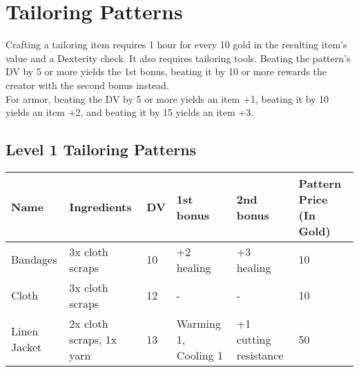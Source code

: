 \section{Tailoring Patterns}\label{sec:tailoringPatterns}
Crafting a tailoring item requires 1 hour for every 10 gold in the resulting item's value and a Dexterity check.
It also requires tailoring tools.
Beating the pattern's DV by 5 or more yields the 1st bonus, beating it by 10 or more rewards the creator with the second bonus instead.\\
For armor, beating the DV by 5 or more yields an item +1, beating it by 10 yields an item +2, and beating it by 15 yields an item +3.\\
	
\subsection{Level 1 Tailoring Patterns}
\begin{longtable}{p{1.5cm} | p{2.5cm} | l | p{2cm} | p{2cm} | p{1cm} }
	Name & Ingredients & DV  & 1st bonus & 2nd bonus & Pattern Price (In Gold)\\ \hline
	Bandages & 3x cloth scraps & 10 & +2 healing & +3 healing & 10\\
	Cloth & 3x cloth scraps & 12 & - & - & 10\\
	Linen Jacket & 2x cloth scraps, 1x yarn & 13 & Warming 1, Cooling 1 & +1 cutting resistance & 50\\
\end{longtable}
%
%
%
%
%
%
%
%
